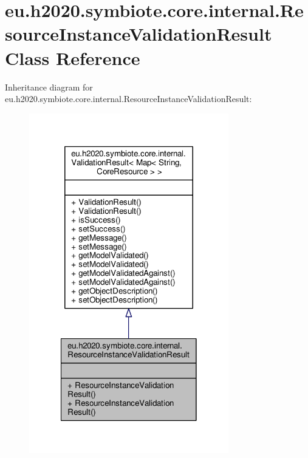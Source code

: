 \hypertarget{classeu_1_1h2020_1_1symbiote_1_1core_1_1internal_1_1ResourceInstanceValidationResult}{}\section{eu.\+h2020.\+symbiote.\+core.\+internal.\+Resource\+Instance\+Validation\+Result Class Reference}
\label{classeu_1_1h2020_1_1symbiote_1_1core_1_1internal_1_1ResourceInstanceValidationResult}


Inheritance diagram for eu.\+h2020.\+symbiote.\+core.\+internal.\+Resource\+Instance\+Validation\+Result\+:\nopagebreak
\begin{figure}[H]
\begin{center}
\leavevmode
\includegraphics[width=246pt]{classeu_1_1h2020_1_1symbiote_1_1core_1_1internal_1_1ResourceInstanceValidationResult__inherit__graph}
\end{center}
\end{figure}


